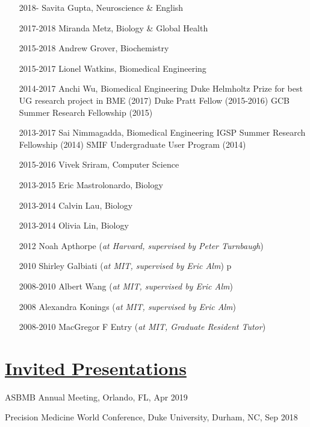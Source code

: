 \documentclass[overlapped,line,11pt]{res}
\begin{document}
\begin{resume}
\begin{itemize}[leftmargin=2cm, style=sameline, itemsep=0mm]
\item[2018-] Savita Gupta, Neuroscience \& English
\item[2017-2018] Miranda Metz, Biology \& Global Health 
\item[2015-2018] Andrew Grover, Biochemistry 
\item[2015-2017] Lionel Watkins, Biomedical Engineering 
\item[2014-2017] Anchi Wu, Biomedical Engineering \newline 
  Duke Helmholtz Prize for best UG research project in BME (2017) \newline
  Duke Pratt Fellow (2015-2016) \newline
  GCB Summer Research Fellowship (2015) 
\item[2013-2017] Sai Nimmagadda, Biomedical Engineering \newline
  IGSP Summer Research Fellowship (2014) \newline
  SMIF Undergraduate User Program (2014)
\item[2015-2016] Vivek Sriram, Computer Science
\item[2013-2015] Eric Mastrolonardo, 
  Biology 
\item[2013-2014] Calvin Lau, Biology 
\item[2013-2014] Olivia Lin, Biology
\item[2012] Noah Apthorpe (\emph{at Harvard, supervised by Peter Turnbaugh})
\item[2010] Shirley Galbiati (\emph{at MIT, supervised by Eric Alm})
p\item[2008-2010] Albert Wang (\emph{at MIT, supervised by Eric Alm})
\item[2008] Alexandra Konings (\emph{at MIT, supervised by Eric Alm})
\item[2008-2010] MacGregor F Entry (\emph{at MIT, Graduate Resident Tutor})
\end{itemize}

\section{\underline{\sc Invited Presentations}}
\vspace{.25in}

\begin{revnumerate}[62]

\item {ASBMB Annual Meeting, Orlando, FL, Apr 2019}

\item {Precision Medicine World Conference, Duke University, Durham, NC, Sep 2018}


\end{revnumerate}
\end{resume}
\end{document}
